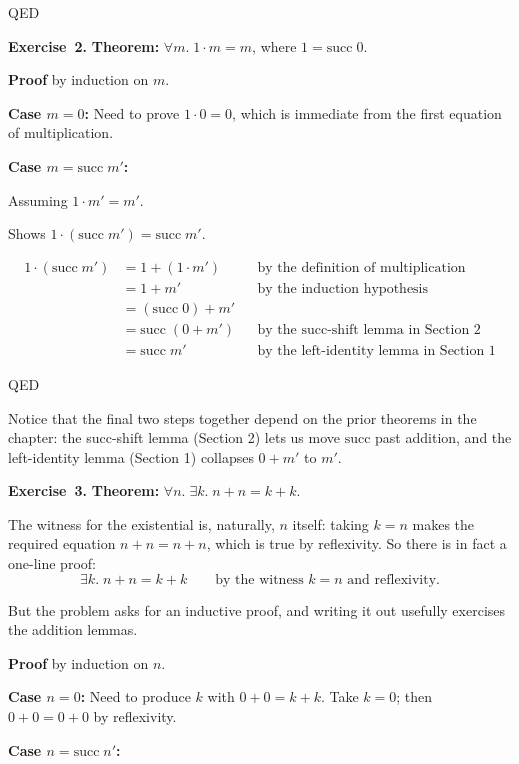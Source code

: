 \documentclass[11pt]{article}
\begin{document}
QED

\medskip
\textbf{Exercise~2.}
\textbf{Theorem:} $\forall m.\; 1 \cdot m = m$, where $1 = \text{succ}\; 0$.

\textbf{Proof} by induction on $m$.

\textbf{Case $m = 0$:} Need to prove $1 \cdot 0 = 0$, which is immediate
from the first equation of multiplication.

\textbf{Case $m = \text{succ}\; m'$:}

Assuming $1 \cdot m' = m'$.

Shows $1 \cdot (\text{succ}\; m') = \text{succ}\; m'$.

\begin{align*}
1 \cdot (\text{succ}\; m')
  &= 1 + (1 \cdot m')      && \text{by the definition of multiplication} \\
  &= 1 + m'                && \text{by the induction hypothesis} \\
  &= (\text{succ}\; 0) + m'                                               \\
  &= \text{succ}\;(0 + m') && \text{by the succ-shift lemma in Section 2} \\
  &= \text{succ}\; m'      && \text{by the left-identity lemma in Section 1}
\end{align*}

QED

Notice that the final two steps together depend on the prior theorems
in the chapter: the succ-shift lemma (Section 2) lets us move
$\text{succ}$ past addition, and the left-identity lemma (Section 1)
collapses $0 + m'$ to $m'$.

\medskip
\textbf{Exercise~3.}
\textbf{Theorem:} $\forall n.\; \exists k.\; n + n = k + k$.

The witness for the existential is, naturally, $n$ itself: taking
$k = n$ makes the required equation $n + n = n + n$, which is true by
reflexivity.  So there is in fact a one-line proof:
\[
  \exists k.\; n + n = k + k \qquad \text{by the witness } k = n
  \text{ and reflexivity}.
\]

But the problem asks for an inductive proof, and writing it out
usefully exercises the addition lemmas.

\textbf{Proof} by induction on $n$.

\textbf{Case $n = 0$:} Need to produce $k$ with $0 + 0 = k + k$.  Take
$k = 0$; then $0 + 0 = 0 + 0$ by reflexivity.

\textbf{Case $n = \text{succ}\; n'$:}
\end{document}
